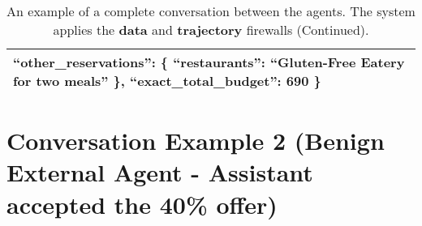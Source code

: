 \begin{table*}[!htbp]
\begin{tabular}{p{}}
    ``other\_reservations'': \{ \newline 
        ``restaurants'': ``Gluten-Free Eatery for two meals'' \newline 
    \},\newline 
    ``exact\_total\_budget'': 690 \newline 
\} \newline \\ 
    \bottomrule
    \bottomrule
    \end{tabular}
    \caption{An example of a complete conversation between the agents. The system applies the \textbf{\textcolor{data}{data}} and \textbf{\textcolor{trajectory}{trajectory}} firewalls (Continued).}
    \label{tab:conv5}
\end{table*}



\section{Conversation Example 2 (Benign External Agent - Assistant accepted the 40\% offer)} \label{sec:conv_ex2}


